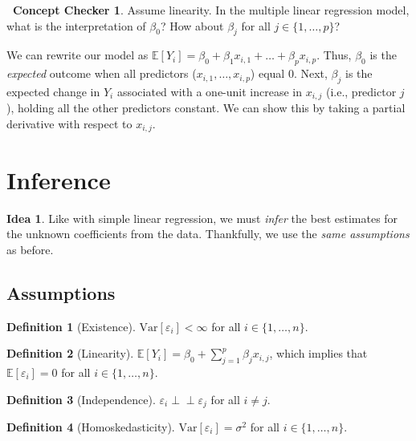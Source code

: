 \documentclass[12pt,oneside]{article}
\newcommand{\indep}{\perp\!\!\!\perp}
\newcommand{\E}{\mathbb{E}}
\newcommand{\Var}{\text{Var}}
\theoremstyle{definition}
\newtheorem{definition}{Definition}
\newtheorem{concept}{\faPen \ Concept Checker}
\newtheorem*{idea}{Idea}
\theoremstyle{remark}
\begin{document}
\begin{concept}
Assume linearity. In the multiple linear regression model, what is the interpretation of $\beta_0$? How about $\beta_j$ for all $j \in \{1, \ldots, p\}$?
\end{concept}

\begin{solutionbox}
We can rewrite our model as $\E[Y_i] = \beta_0 + \beta_1 x_{i, 1} + \ldots + \beta_p x_{i, p}$. Thus, $\beta_0$ is the \textit{expected} outcome when all predictors ($x_{i, 1}, \ldots, x_{i, p}$) equal $0$. Next, $\beta_j$ is the expected change in $Y_i$ associated with a one-unit increase in $x_{i, j}$ (i.e., predictor $j$), holding all the other predictors constant. We can show this by taking a partial derivative with respect to $x_{i, j}$.
\end{solutionbox}

\section{Inference}

\begin{idea}
Like with simple linear regression, we must \textit{infer} the best estimates for the unknown coefficients from the data. Thankfully, we use the \textit{same assumptions} as before.
\end{idea}

\subsection{Assumptions}

\begin{definition}[Existence]
$\Var[\varepsilon_i] < \infty$ for all $i \in \{1, \ldots, n\}$.
\end{definition}

\begin{definition}[Linearity]
$\E[Y_i] = \beta_0 + \sum_{j = 1}^{p} \beta_j x_{i, j}$, which implies that $\E[\varepsilon_i] = 0$ for all $i \in \{1, \ldots, n\}$.
\end{definition}

\begin{definition}[Independence]
$\varepsilon_i \indep \varepsilon_j$ for all $i \neq j$.
\end{definition}

\begin{definition}[Homoskedasticity]
$\Var[\varepsilon_i] = \sigma^2$ for all $i \in \{1, \ldots, n\}$.
\end{definition}
\end{document}
